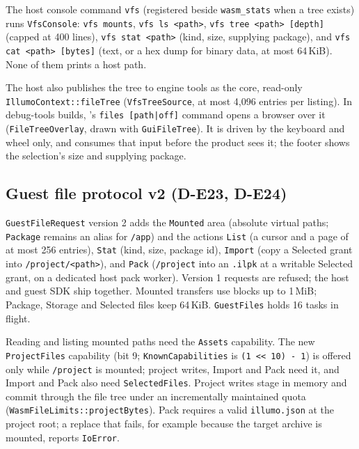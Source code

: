 The host console command \texttt{vfs} (registered beside \texttt{wasm\_stats}
when a tree exists) runs \texttt{VfsConsole}:
\texttt{vfs mounts}, \texttt{vfs ls <path>}, \texttt{vfs tree <path> [depth]}
(capped at 400 lines), \texttt{vfs stat <path>} (kind, size, supplying
package), and \texttt{vfs cat <path> [bytes]} (text, or a hex dump for binary
data, at most 64\,KiB). None of them prints a host path.

The host also publishes the tree to engine tools as the core, read-only
 \texttt{IllumoContext::fileTree}
(\texttt{VfsTreeSource}, at most 4,096 entries per listing). In debug-tools
builds, 's \texttt{files [path|off]} command opens a browser over
it (\texttt{FileTreeOverlay}, drawn with \texttt{GuiFileTree}). It is driven by
the keyboard and wheel only, and consumes that input before the product sees
it; the footer shows the selection's size and supplying package.

\subsection{Guest file protocol v2 (D-E23, D-E24)}
\texttt{GuestFileRequest} version 2 adds the \texttt{Mounted} area (absolute
virtual paths; \texttt{Package} remains an alias for \texttt{/app}) and the
actions \texttt{List} (a cursor and a page of at most 256 entries),
\texttt{Stat} (kind, size, package id), \texttt{Import} (copy a Selected grant
into \texttt{/project/<path>}), and \texttt{Pack} (\texttt{/project} into an
\texttt{.ilpk} at a writable Selected grant, on a dedicated host pack worker).
Version 1 requests are refused; the host and guest SDK ship together. Mounted
transfers use blocks up to 1\,MiB; Package, Storage and Selected files keep
64\,KiB. \texttt{GuestFiles} holds 16 tasks in flight.

Reading and listing mounted paths need the \texttt{Assets} capability. The new
\texttt{ProjectFiles} capability (bit 9; \texttt{KnownCapabilities} is
\texttt{(1 <{}< 10) - 1}) is offered only while \texttt{/project} is mounted;
project writes, Import and Pack need it, and Import and Pack also need
\texttt{SelectedFiles}. Project writes stage in memory and commit through the
file tree under an incrementally maintained quota
(\texttt{WasmFileLimits::projectBytes}). Pack requires a valid
\texttt{illumo.json} at the project root; a replace that fails, for example
because the target archive is mounted, reports \texttt{IoError}.

